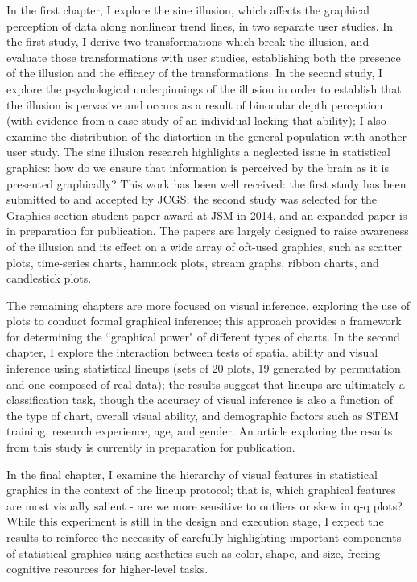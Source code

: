 \documentclass[11pt,letterpaper,sans,unicode]{moderncv}        %
\begin{document}
In the first chapter, I explore the sine illusion, which affects the graphical perception of data along nonlinear trend lines, in two separate user studies. In the first study, I derive two transformations which break the illusion, and evaluate those transformations with user studies, establishing both the presence of the illusion and the efficacy of the transformations. In the second study, I explore the psychological underpinnings of the illusion in order to establish that the illusion is pervasive and occurs as a result of binocular depth perception (with evidence from a case study of an individual lacking that ability); I also examine the distribution of the distortion in the general population with another user study. The sine illusion research highlights a neglected issue in statistical graphics: how do we ensure that information is perceived by the brain as it is presented graphically? This work has been well received: the first study has been submitted to and accepted by JCGS; the second study was selected for the Graphics section student paper award at JSM in 2014, and an expanded paper is in preparation for publication. The papers are largely designed to raise awareness of the illusion and its effect on a wide array of oft-used graphics, such as scatter plots, time-series charts, hammock plots, stream graphs, ribbon charts, and candlestick plots. 

The remaining chapters are more focused on visual inference, exploring the use of plots to conduct formal graphical inference; this approach provides a framework for determining the ``graphical power" of different types of charts. In the second chapter, I explore the interaction between tests of spatial ability and visual inference using statistical lineups (sets of 20 plots, 19 generated by permutation and one composed of real data); the results suggest that lineups are ultimately a classification task, though the accuracy of visual inference is also a function of the type of chart, overall visual ability, and demographic factors such as STEM training, research experience, age, and gender. An article exploring the results from this study is currently in preparation for publication.

In the final chapter, I examine the hierarchy of visual features in statistical graphics in the context of the lineup protocol; that is, which graphical features are most visually salient - are we more sensitive to outliers or skew in q-q plots? While this experiment is still in the design and execution stage, I expect the results to reinforce the necessity of carefully highlighting important components of statistical graphics using aesthetics such as color, shape, and size, freeing cognitive resources for higher-level tasks. 
\end{document}
